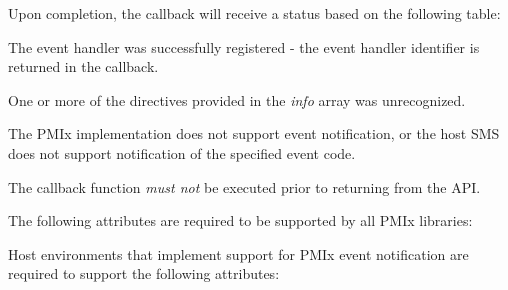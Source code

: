 \begin{arglist}
\end{arglist}

Upon completion, the callback will receive a status based on the following table:

\begin{constantdesc}
\item {} The event handler was successfully registered - the event handler identifier is returned in the callback.
\item {} One or more of the directives provided in the \textit{info} array was unrecognized.
\item {} The \ac{PMIx} implementation does not support event notification, or the host \ac{SMS} does not support notification of the specified event code.
\end{constantdesc}

The callback function \emph{must not} be executed prior to returning from the \ac{API}.

\reqattrstart
The following attributes are required to be supported by all \ac{PMIx} libraries:


\divider

Host environments that implement support for \ac{PMIx} event notification are required to support the following attributes:

